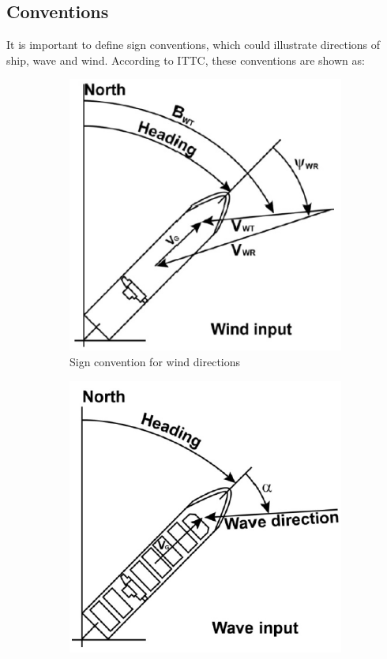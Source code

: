 \subsection{Conventions}
It is important to define sign conventions, which could illustrate directions of ship, wave and wind. According to ITTC\cite{2017ITTC}, these conventions are shown as:
\begin{figure}[H]
    \centering
    \begin{subfigure}[c]{0.45\textwidth}
        \centering
        \includegraphics[width=\textwidth]{wind direction.png}
        \caption{Sign convention for wind directions}
        \label{wind directions}
    \end{subfigure}
    \begin{subfigure}[c]{0.45\textwidth}
        \centering
        \includegraphics[width=\textwidth]{wave direction.png}

\end{subfigure}
\end{figure}
